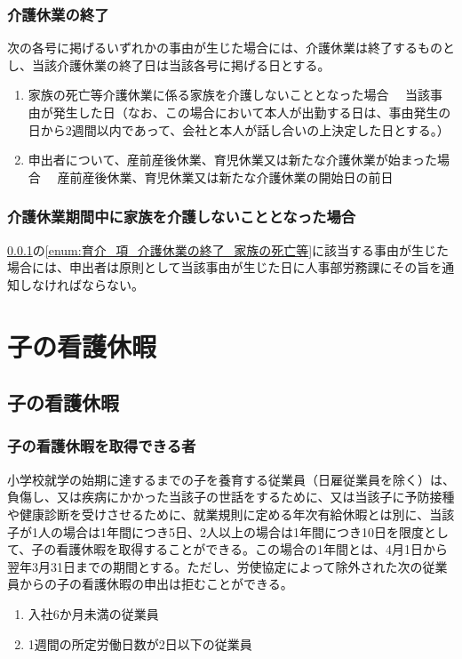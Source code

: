 \documentclass{jsarticle}
\begin{document}
\subsubsection{介護休業の終了}
\label{育介_項_介護休業の終了}
次の各号に掲げるいずれかの事由が生じた場合には、介護休業は終了するものとし、当該介護休業の終了日は当該各号に掲げる日とする。 
\begin{enumerate}
  \item 家族の死亡等介護休業に係る家族を介護しないこととなった場合\label{enum:育介_項_介護休業の終了_家族の死亡等}
        　当該事由が発生した日（なお、この場合において本人が出勤する日は、事由発生の日から2週間以内であって、会社と本人が話し合いの上決定した日とする。）
  \item 申出者について、産前産後休業、育児休業又は新たな介護休業が始まった場合
        　産前産後休業、育児休業又は新たな介護休業の開始日の前日
\end{enumerate}

\subsubsection{介護休業期間中に家族を介護しないこととなった場合}
\label{育介_項_介護休業期間中に家族を介護しないこととなった場合}
\ref{育介_項_介護休業の終了}の\ref{enum:育介_項_介護休業の終了_家族の死亡等}に該当する事由が生じた場合には、申出者は原則として当該事由が生じた日に人事部労務課にその旨を通知しなければならない。 

\section{子の看護休暇}

\subsection{子の看護休暇}
\label{育介_条_子の看護休暇}

\subsubsection{子の看護休暇を取得できる者}
\label{育介_項_子の看護休暇を取得できる者}
小学校就学の始期に達するまでの子を養育する従業員（日雇従業員を除く）は、負傷し、又は疾病にかかった当該子の世話をするために、又は当該子に予防接種や健康診断を受けさせるために、就業規則に定める年次有給休暇とは別に、当該子が1人の場合は1年間につき5日、2人以上の場合は1年間につき10日を限度として、子の看護休暇を取得することができる。この場合の1年間とは、4月1日から翌年3月31日までの期間とする。ただし、労使協定によって除外された次の従業員からの子の看護休暇の申出は拒むことができる。
\begin{enumerate}
  \item 入社6か月未満の従業員
  \item 1週間の所定労働日数が2日以下の従業員 
\end{enumerate}
\end{document}
